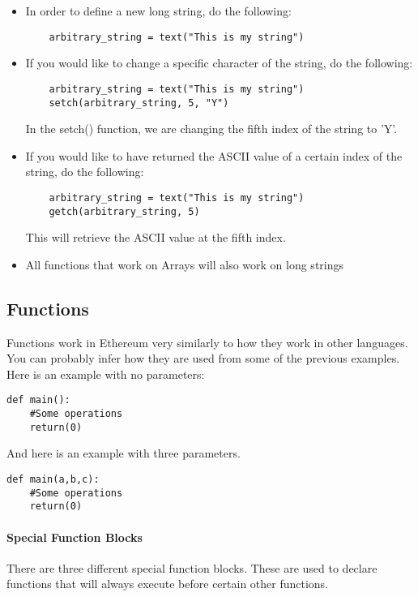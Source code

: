 \documentclass[12pt]{article}
\begin{document}
\begin{itemize}
\item In order to define a new long string, do the following:
	\begin{lstlisting}
	arbitrary_string = text("This is my string")
	\end{lstlisting}
\item If you would like to change a specific character of the string, do the following:
	\begin{lstlisting}
	arbitrary_string = text("This is my string")
	setch(arbitrary_string, 5, "Y")
	\end{lstlisting}
	In the setch() function, we are changing the fifth index of the string to 'Y'.
\item If you would like to have returned the ASCII value of a certain index of the string, do the following:
	\begin{lstlisting}
	arbitrary_string = text("This is my string")
	getch(arbitrary_string, 5)
	\end{lstlisting}
	This will retrieve the ASCII value at the fifth index.
\item All functions that work on Arrays will also work on long strings
\end{itemize}
	
\subsection{Functions}
Functions work in Ethereum very similarly to how they work in other languages. You can probably infer how they are used from some of the previous examples. Here is an example with no parameters:

\begin{lstlisting}
def main():
	#Some operations
	return(0)
\end{lstlisting}

And here is an example with three parameters.

\begin{lstlisting}
def main(a,b,c):
	#Some operations
	return(0)
\end{lstlisting}

\paragraph{Special Function Blocks}
There are three different special function blocks. These are used to declare functions that will always execute before certain other functions.
\end{document}
